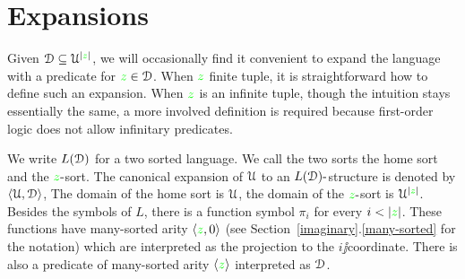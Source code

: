\documentclass[creche.tex]{subfiles}
\begin{document}
\begin{comment}
La seguente proposizione giustifica la definizione di $p^{(\omega)}$, la dimostrazione \`e immediata.

\begin{proposition}\label{prop_p^omega_Morley}
Sia $p(x)\in S(\U)$ un tipo globale $A\jj$invariante. Allora le seguenti affermazioni sono equivalenti
\begin{itemize}
\item[1.]$\<c_i:i<\omega\>$ \`e una sequenze di Morley di $p$ su $A$;
\item[2.] $\<c_i:i<\omega\>\models p^{(\omega)}|_A$
\end{itemize}
\end{proposition}

La seguente proposizione torner\`a utile nei prossimi paragrafi, si osservi che  non \`e una conseguenza della proposizione~\ref{prop_p^omega_Morley} perch\'e qui l'invarianza su $A$ non \`e tra le ipotesi.

\begin{proposition}
Sia $p(x)\in S(\U)$ un tipo globale invariante ed $A$ un insieme arbitrario. Allora ogni $\<c_i:i<\omega\>\models p^{(\omega)}|_A$ \`e una sequenza di indiscernibili su $A$.
\end{proposition}


\begin{proof}
\`E sufficiente verificare che se $\<c_i:i<\omega\>\models p^{(\omega)}|_A$ allora $c_{i_0},\dots,c_{i_n}\models p^{(n+1)}|_A$ per ogni $i_0<\dots<i_n<\omega$. 
\end{proof}



\end{comment}

\section{Expansions}
\label{expansions}

Given $\EuScript D\subseteq\EuScript U^{|{\color{green} z}|}$, we will occasionally find it convenient to expand the language with a predicate for ${\color{green} z}\in\EuScript D$. When ${\color{green} z}$ finite tuple, it is straightforward how to define such an expansion. When ${\color{green} z}$ is an infinite tuple, though the intuition stays essentially the same, a more involved definition is required because first-order logic does not allow infinitary predicates.
 
We write \emph{$L(\EuScript D)$\/} for a two sorted language. We call the two sorts the home sort and the ${\color{green} z}\mbox{-}$sort. The canonical expansion of $\EuScript U$ to an $L(\EuScript D)\mbox{-}$structure is denoted by $\langle\EuScript U,\EuScript D\rangle$, The domain of the home sort is $\EuScript U$, the domain of the ${\color{green} z}\mbox{-}$sort is $\EuScript U^{|{\color{green} z}|}$. Besides the symbols of $L$, there is a function symbol $\pi_i$ for every $i<|{\gr z}|$. These functions have many-sorted arity $\langle{\color{green}z},0\rangle$  (see Section~\ref{imaginary}.\ref{many-sorted} for the notation) which are interpreted as the projection to the $i\jj$coordinate. There is also a predicate of many-sorted arity $\langle{\color{green}z}\rangle$ interpreted as $\EuScript D$.
\end{document}
